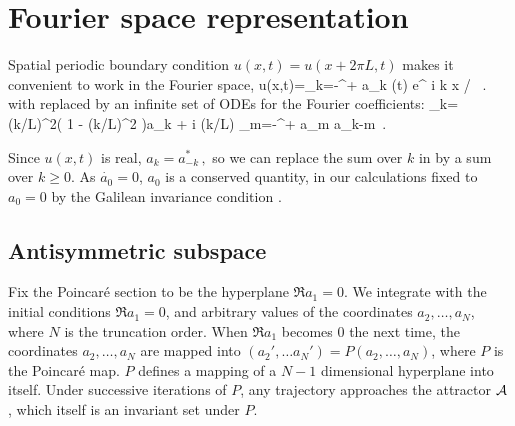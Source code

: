 \section{Fourier space representation} 
\label{s:FourierModes}



\noindent
Spatial periodic boundary condition $u(x,t)=u(x+2\pi L,t)$
makes it convenient to work in the Fourier space, 
\beq
  u(x,t)=\sum_{k=-\infty}^{+\infty} a_k (t) e^{ i k x / }
\, .
with  replaced by an infinite set of 
ODEs for the Fourier coefficients:
\beq
_k=(k/L)^2\left( 1 - (k/L)^2  \right)a_k 
 	 + i (k/L) \sum_{m=-\infty}^{+\infty} a_m a_{k-m}
\,.
%


Since $u(x,t)$ is real,
$ %
a_k=a_{-k}^*
\,,
$ %
so we can replace the sum over $k$ in  by a
sum over $k \geq 0$.
As  $\dot{a_0}=0$, $a_0$ is a conserved quantity,
in our calculations
fixed to $a_0=0$ by
the Galilean invariance condition .


\subsection{Antisymmetric subspace} 
\label{s:AntisymmSubsp}

Fix the  Poincar\'e section to be the hyperplane
$\Re a_1=0$. We integrate  with the initial
 conditions
$\Re a_1=0$, and arbitrary values of the coordinates  $a_2, \ldots, a_N$, where
$N$ is the truncation order.  When $\Re a_1$ becomes
$0$ the next time,  the coordinates  $a_2, \ldots, a_N$ are mapped
into $(a_2', \ldots a_N')=P(a_2, \ldots, a_N)$, where $P$ is the  Poincar\'e
map. $P$ defines a mapping of a $N-1$ dimensional hyperplane into itself.
Under successive iterations of  $P$, any trajectory
approaches the attractor ${\cal A}$, which itself is an invariant
set under $P$.

